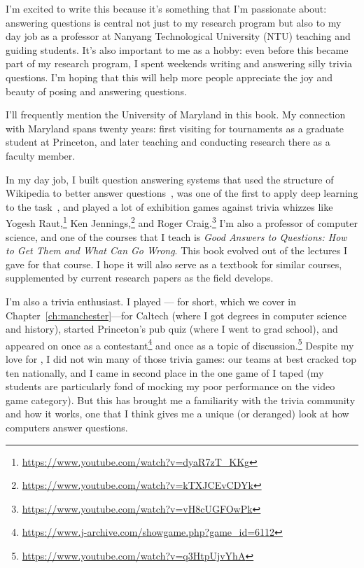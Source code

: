 
I’m excited to write this because it’s something that I’m 
passionate about: answering questions is central
not just to my research program but also to my day job as a professor
at Nanyang Technological University (NTU) teaching and guiding
students.  It’s also important to me as a hobby: even before this became part
of my research program, I spent weekends writing and answering silly
trivia questions.  I’m hoping that this will help more people appreciate the
joy and beauty of posing and answering questions.

I'll frequently mention the University of Maryland in this book.
%
My connection with Maryland spans twenty years: first visiting for
\quizbowl{} tournaments as a graduate student at Princeton, and later
teaching and conducting research there as a faculty member.

In my day job, I built question answering systems that used the structure
of Wikipedia to better answer questions~\citep{Zhao-21}, was one of the first to apply deep
learning to the  task~\citep{iyyer-15}, and played a lot of exhibition games against
trivia whizzes like Yogesh Raut,\footnote{\url{https://www.youtube.com/watch?v=dyaR7zT_KKg}}
Ken Jennings,\footnote{\url{https://www.youtube.com/watch?v=kTXJCEvCDYk}} and Roger 
Craig.\footnote{\url{https://www.youtube.com/watch?v=vH8cUGFOwPk}}
I'm also a professor of computer science, and one of the courses that I teach is 
\textit{Good  Answers to Questions: How to Get Them and What Can Go Wrong}.
%
This book evolved out of the lectures I gave for that course.
%
I hope it will also serve as a textbook for similar courses, supplemented
by current research papers as the field develops.

I'm also a trivia enthusiast.  I played \quizbowl{}---\qb{} for short,
which we cover in Chapter~\ref{ch:manchester}---for Caltech (where I
got  degrees in computer science and history), started Princeton's pub
quiz (where I went to grad school), and appeared on \jeopardy{} once as a contestant\footnote{\url{https://www.j-archive.com/showgame.php?game_id=6112}}
and once as a topic of discussion.\footnote{\url{https://www.youtube.com/watch?v=q3HtpUjvYhA}}
%
Despite my love for \qb{}, I did not win many of those trivia games: our \qb{} teams at best cracked top
ten nationally, and I came in second place in the one game of \jeopardy{} I
taped (my students are particularly fond of mocking my poor performance on the
video game category).
%
But this has brought me a familiarity with the trivia community and how it
works, one that I think gives me a unique (or deranged) look at how computers
answer questions.

